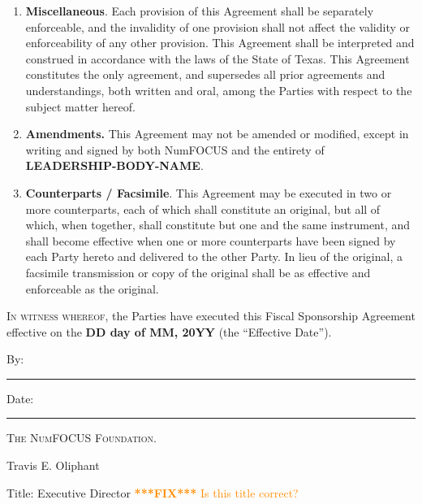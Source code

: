 \documentclass[letterpaper,12pt]{article}
\newcommand{\fix}[1]{
  \textcolor{darkorange} { \textbf{***FIX***} #1 } }
\newcommand{\signatories}{\textbf{SIGNATORIES}}
\newcommand{\leadershipbody}{\textbf{LEADERSHIP-BODY-NAME}}
\newcommand{\agreementdate}{\textbf{DD day of MM, 20YY}}
\begin{document}
\begin{enumerate}[label=\arabic*.,ref=\S~\arabic*]
\begin{enumerate}[label=\alph*.,ref=\theenumi(\arabic*)]
\item \textbf{Termination Without a Successor}. If no Successor is found,
  NumFOCUS may dispose of Project assets and liabilities in any manner
  consistent with applicable tax and charitable trust laws.

\item \textbf{\signatories{}' Right to Terminate.}  The \signatories{} hereby
  acknowledge that they will relinquish any rights to terminate separate from
  the \leadershipbody{} as of the Effective Date.

\end{enumerate}

\item \textbf{Miscellaneous}. Each provision of this Agreement shall be
  separately enforceable, and the invalidity of one provision shall not affect
  the validity or enforceability of any other provision.  This Agreement shall
  be interpreted and construed in accordance with the laws of the State of
  Texas. This Agreement constitutes the only agreement, and supersedes all
  prior agreements and understandings, both written and oral, among the Parties
  with respect to the subject matter hereof.

\item \textbf{Amendments. }This Agreement may not be amended or modified,
  except in writing and signed by both NumFOCUS and the entirety of
  \leadershipbody{}.

\item \textbf{Counterparts / Facsimile}. This Agreement may be executed in two
  or more counterparts, each of which shall constitute an original, but all of
  which, when together, shall constitute but one and the same instrument, and
  shall become effective when one or more counterparts have been signed by each
  Party hereto and delivered to the other Party.  In lieu of the original, a
  facsimile transmission or copy of the original shall be as effective and
  enforceable as the original.

\end{enumerate}

\vfill{}


\textsc{In witness whereof}, the Parties have executed this Fiscal
Sponsorship Agreement effective on the \agreementdate{} (the
``Effective Date'').

\vspace{3em}


By: \hspace{0.95em}\rule{0.50\textwidth}{0.2mm} \hfill{}Date: \rule{0.25\textwidth}{0.2mm}

\hspace{2.5em} \textsc{The NumFOCUS Foundation.}

\hspace{2.5em} Travis E. Oliphant

\hspace{2.5em} Title: Executive Director \fix{Is this title correct?} \\[6ex]

\vspace{2ex}


\end{document}
